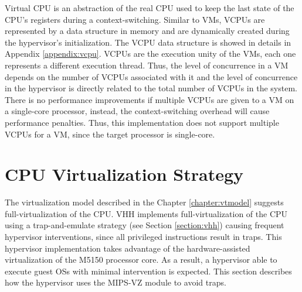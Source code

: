 Virtual CPU is an abstraction of the real CPU used to keep the last state of the CPU's registers during a context-switching. Similar to VMs, VCPUs are represented by a data structure in memory and are dynamically created during the hypervisor’s initialization. The VCPU data structure is showed in details in Appendix \ref{appendix:vcpu}. VCPUs are the execution unity of the VMs, each one represents a different execution thread. Thus, the level of concurrence in a VM depends on the number of VCPUs associated with it and the level of concurrence in the hypervisor is directly related to the total number of VCPUs in the system. There is no performance improvements if multiple VCPUs are given to a VM on a single-core processor, instead, the context-switching overhead will cause performance penalties. Thus, this implementation does not support multiple VCPUs for a VM, since the target processor is single-core. 


\section{CPU Virtualization Strategy}

The virtualization model described in the Chapter \ref{chapter:vtmodel} suggests full-virtualization of the CPU. VHH \cite{aguiar2013} implements full-virtualization of the CPU using a trap-and-emulate strategy (see Section \ref{section:vhh}) causing frequent hypervisor interventions, since all privileged instructions result in traps. This hypervisor implementation takes advantage of the hardware-assisted virtualization of the M5150 processor core. As a result, a hypervisor able to execute guest OSs with minimal intervention is expected. This section describes how the hypervisor uses the MIPS-VZ module to avoid traps. 

